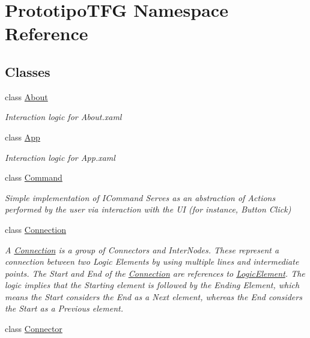 \hypertarget{namespace_prototipo_t_f_g}{}\section{Prototipo\+T\+F\+G Namespace Reference}
\label{namespace_prototipo_t_f_g}
\subsection*{Classes}
\begin{DoxyCompactItemize}
\item 
class \hyperlink{class_prototipo_t_f_g_1_1_about}{About}
\begin{DoxyCompactList}\small\item\em Interaction logic for About.\+xaml \end{DoxyCompactList}\item 
class \hyperlink{class_prototipo_t_f_g_1_1_app}{App}
\begin{DoxyCompactList}\small\item\em Interaction logic for App.\+xaml \end{DoxyCompactList}\item 
class \hyperlink{class_prototipo_t_f_g_1_1_command}{Command}
\begin{DoxyCompactList}\small\item\em Simple implementation of I\+Command Serves as an abstraction of Actions performed by the user via interaction with the U\+I (for instance, Button Click) \end{DoxyCompactList}\item 
class \hyperlink{class_prototipo_t_f_g_1_1_connection}{Connection}
\begin{DoxyCompactList}\small\item\em A \hyperlink{class_prototipo_t_f_g_1_1_connection}{Connection} is a group of Connectors and Inter\+Nodes. These represent a connection between two Logic Elements by using multiple lines and intermediate points. The Start and End of the \hyperlink{class_prototipo_t_f_g_1_1_connection}{Connection} are references to \hyperlink{class_prototipo_t_f_g_1_1_logic_element}{Logic\+Element}. The logic implies that the Starting element is followed by the Ending Element, which means the Start considers the End as a Next element, whereas the End considers the Start as a Previous element. \end{DoxyCompactList}\item 
class \hyperlink{class_prototipo_t_f_g_1_1_connector}{Connector}

\end{DoxyCompactItemize}
